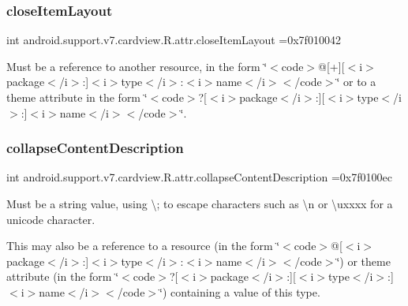 \subsubsection{\texorpdfstring{close\+Item\+Layout}{closeItemLayout}}
{\footnotesize\ttfamily int android.\+support.\+v7.\+cardview.\+R.\+attr.\+close\+Item\+Layout =0x7f010042\hspace{0.3cm}{\ttfamily [static]}}

Must be a reference to another resource, in the form \char`\"{}$<$code$>$@\mbox{[}+\mbox{]}\mbox{[}$<$i$>$package$<$/i$>$\+:\mbox{]}$<$i$>$type$<$/i$>$\+:$<$i$>$name$<$/i$>$$<$/code$>$\char`\"{} or to a theme attribute in the form \char`\"{}$<$code$>$?\mbox{[}$<$i$>$package$<$/i$>$\+:\mbox{]}\mbox{[}$<$i$>$type$<$/i$>$\+:\mbox{]}$<$i$>$name$<$/i$>$$<$/code$>$\char`\"{}. \mbox{\label{classandroid_1_1support_1_1v7_1_1cardview_1_1R_1_1attr_a63ef16088f42dd2933387645ad902d1a}} 
\subsubsection{\texorpdfstring{collapse\+Content\+Description}{collapseContentDescription}}
{\footnotesize\ttfamily int android.\+support.\+v7.\+cardview.\+R.\+attr.\+collapse\+Content\+Description =0x7f0100ec\hspace{0.3cm}{\ttfamily [static]}}

Must be a string value, using \textquotesingle{}\textbackslash{};\textquotesingle{} to escape characters such as \textquotesingle{}\textbackslash{}n\textquotesingle{} or \textquotesingle{}\textbackslash{}uxxxx\textquotesingle{} for a unicode character. 

This may also be a reference to a resource (in the form \char`\"{}$<$code$>$@\mbox{[}$<$i$>$package$<$/i$>$\+:\mbox{]}$<$i$>$type$<$/i$>$\+:$<$i$>$name$<$/i$>$$<$/code$>$\char`\"{}) or theme attribute (in the form \char`\"{}$<$code$>$?\mbox{[}$<$i$>$package$<$/i$>$\+:\mbox{]}\mbox{[}$<$i$>$type$<$/i$>$\+:\mbox{]}$<$i$>$name$<$/i$>$$<$/code$>$\char`\"{}) containing a value of this type. \mbox{\label{classandroid_1_1support_1_1v7_1_1cardview_1_1R_1_1attr_ad40e98628ccb842b3417d04260e74b66}} 
